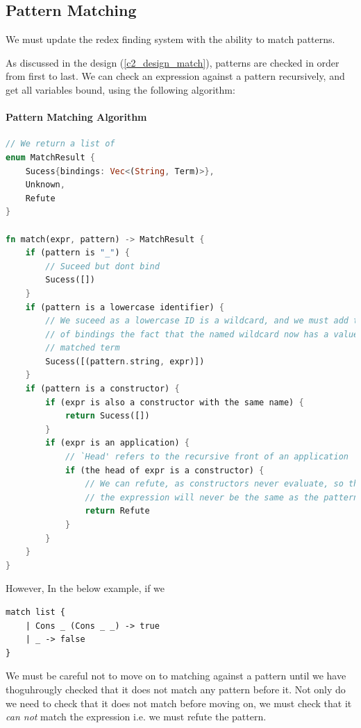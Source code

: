 \pagebreak %

\subsection{Pattern Matching}
We must update the redex finding system with the ability to match patterns. 

As discussed in the design (\ref{c2_design_match}), patterns are checked in order from first to last. We can check an expression against a pattern recursively, and get all variables bound, using the following algorithm:

\paragraph{Pattern Matching Algorithm}
\begin{lstlisting}[language=Rust]
// We return a list of 
enum MatchResult {
    Sucess{bindings: Vec<(String, Term)>},
    Unknown,
    Refute
}

fn match(expr, pattern) -> MatchResult {
    if (pattern is "_") {
        // Suceed but dont bind
        Sucess([])
    }
    if (pattern is a lowercase identifier) {
        // We suceed as a lowercase ID is a wildcard, and we must add to our list 
        // of bindings the fact that the named wildcard now has a value, which is the
        // matched term 
        Sucess([(pattern.string, expr)])
    }
    if (pattern is a constructor) {
        if (expr is also a constructor with the same name) {
            return Sucess([])
        }
        if (expr is an application) {
            // `Head' refers to the recursive front of an application
            if (the head of expr is a constructor) {
                // We can refute, as constructors never evaluate, so the structure of 
                // the expression will never be the same as the pattern
                return Refute
            }
        }
    }
}
\end{lstlisting}

However, In the below example, if we 
\begin{lstlisting}[language=SFL]
match list {
    | Cons _ (Cons _ _) -> true
    | _ -> false
}
\end{lstlisting}
We must be careful not to move on to matching against a pattern until we have thoguhrougly checked that it does not match any pattern before it. Not only do we need to check that it does not match before moving on, we must check that it \textit{can not} match the expression i.e. we must refute the pattern. 



